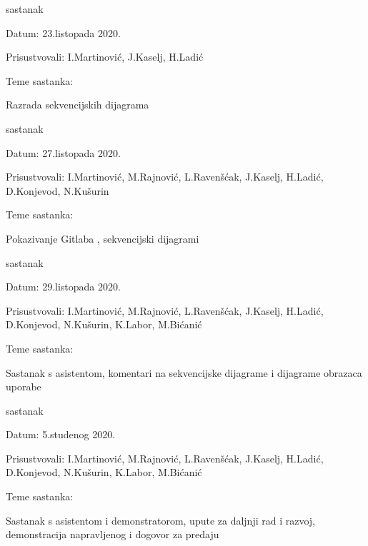 \begin{packed_enum}
			
			\item sastanak
			\item[] \begin{packed_item}
				\item Datum: 23.listopada 2020.
				\item Prisustvovali: I.Martinović, J.Kaselj, H.Ladić
				\item Teme sastanka: 
				\begin{packed_item}
					\item   Razrada sekvencijskih dijagrama
				\end{packed_item}
			\end{packed_item}

                         \item sastanak
			\item[] \begin{packed_item}
				\item Datum: 27.listopada 2020.
				\item Prisustvovali: I.Martinović, M.Rajnović, L.Ravenšćak, J.Kaselj, H.Ladić, D.Konjevod, N.Kušurin
				\item Teme sastanka: 
				\begin{packed_item}
					\item   Pokazivanje Gitlaba , sekvencijski dijagrami
				\end{packed_item}
			\end{packed_item}
			
			\item sastanak
			\item[] \begin{packed_item}
				\item Datum: 29.listopada 2020.
				\item Prisustvovali: I.Martinović, M.Rajnović, L.Ravenšćak, J.Kaselj, H.Ladić, D.Konjevod, N.Kušurin, K.Labor, M.Bićanić
				\item Teme sastanka: 
				\begin{packed_item}
					\item   Sastanak s asistentom, komentari na sekvencijske dijagrame i dijagrame obrazaca uporabe
				\end{packed_item}
			\end{packed_item}
		\item sastanak
		\item[] \begin{packed_item}
			\item Datum: 5.studenog 2020.
			\item Prisustvovali: I.Martinović, M.Rajnović, L.Ravenšćak, J.Kaselj, H.Ladić, D.Konjevod, N.Kušurin, K.Labor, M.Bićanić
			\item Teme sastanka: 
			\begin{packed_item}
				\item   Sastanak s asistentom i demonstratorom, upute za daljnji rad i razvoj, demonstracija napravljenog i dogovor za predaju
			\end{packed_item}
		\end{packed_item}
			
			
		\end{packed_enum}
		
